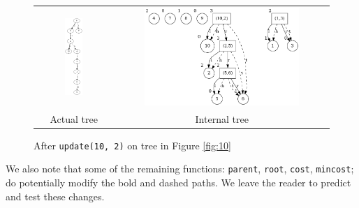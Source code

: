 \documentclass[a4paper, 11pt]{article}
\begin{document}
\begin{figure}[H]
\centering
\begin{tabular}{cc}
  \includegraphics[width=0.25\textwidth]{img/visualisations/test2/update.png} & \includegraphics[width=0.75\textwidth]{img/visualisations/test2/iupdate.png} \\
  Actual tree & Internal tree \\
\end{tabular}
\caption{After \texttt{update(10, 2)} on tree in Figure \ref{fig:10}}
\label{fig:13}
\end{figure}

We also note that some of the remaining functions: \texttt{parent}, \texttt{root}, \texttt{cost}, \texttt{mincost}; do potentially modify the bold and dashed paths. We leave the reader to predict and test these changes.
\end{document}
